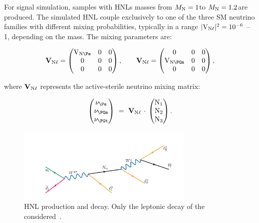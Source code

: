 For signal simulation, samples with HNLs masses from 
$M_{\mathrm{N}} = 1$\GeV to $M_{\mathrm{N}} = 1.2$\TeV are produced. The simulated HNL couple
exclusively to one of the three SM neutrino families with different
mixing probabilities, typically in a range $\mathrm{|V_{\mathrm{N}\ell}|^2} = 10^{-6}$ -- 1,
depending on the mass. The mixing parameters are:
\begin{linenomath}
\begin{equation}
  \mathbf{V}_{\hnl\ell} =
  \begin{pmatrix}
    \mathrm{V}_{\hnl\Pe} & 0 & 0 \\
    0                   & 0 & 0 \\
    0                   & 0 & 0 \\
  \end{pmatrix},
\quad\quad
  \mathbf{V}_{\hnl\ell} =
  \begin{pmatrix}
    0                    & 0 & 0 \\
    \mathrm{V}_{\hnl\PGm} & 0 & 0 \\
    0                    & 0 & 0 \\
  \end{pmatrix},
\end{equation}
\end{linenomath}
where $\mathbf{V}_{\mathrm{N}\ell}$ represents the active-sterile neutrino
mixing matrix:
\begin{linenomath}
\begin{equation}
  \begin{pmatrix}
    \nu_{\Pe}  \\
    \nu_{\PGm} \\
    \nu_{\PGt} \\
  \end{pmatrix} ~=~
  \mathbf{V}_{\hnl\ell}\,\cdot\,
  \begin{pmatrix}
    \hnl_{1} \\
    \hnl_{2} \\
    \hnl_{3} \\
  \end{pmatrix}.
\end{equation}
\end{linenomath}

\begin{figure}[h!]
\centering
 \includegraphics[clip,trim=0.5cm 0.5cm 0.5cm 2.5cm, width=0.75\textwidth]{Figures/c4/hnl_graph}
  \caption{HNL production and decay. Only the leptonic decay of the \PW considered~\cite{Pascoli_2019}.}
  \label{fig:c46}
\end{figure}


